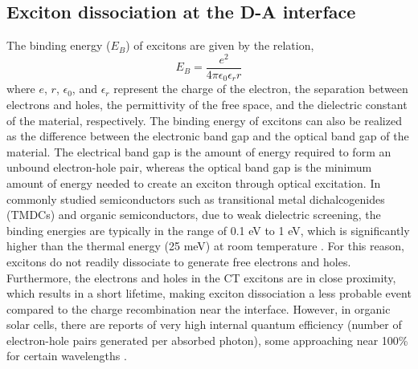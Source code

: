 \documentclass[12pt]{article}
\begin{document}
\subsection{Exciton dissociation at the D-A interface}
The binding energy ($E_B$) of excitons are given by the relation,
\begin{equation}
    E_B = \frac{e^2}{4\pi\epsilon_0\epsilon_rr}
\end{equation}
where $e$, $r$, $\epsilon_0$, and $\epsilon_r$ represent the charge of the electron, the separation between electrons and holes, the permittivity of the free space, and the dielectric constant of the material, respectively. The binding energy of excitons can also be realized as the difference between the electronic band gap and the optical band gap of the material. The electrical band gap is the amount of energy required to form an unbound electron-hole pair, whereas the optical band gap is the minimum amount of energy needed to create an exciton through optical excitation. In commonly studied semiconductors such as transitional metal dichalcogenides (TMDCs) and organic semiconductors, due to weak dielectric screening, the binding energies are typically in the range of 0.1 eV to 1 eV, which is significantly higher than the thermal energy (25 meV) at room temperature \cite{knupfer2003exciton,pospischil2016optoelectronic}. For this reason, excitons do not readily dissociate to generate free electrons and holes. Furthermore, the electrons and holes in the CT excitons are in close proximity, which results in a short lifetime, making exciton dissociation a less probable event compared to the charge recombination near the interface. However, in organic solar cells, there are reports of very high internal quantum efficiency (number of electron-hole pairs generated per absorbed photon), some approaching near 100\% for certain wavelengths \cite{park2009bulk}.
\end{document}
